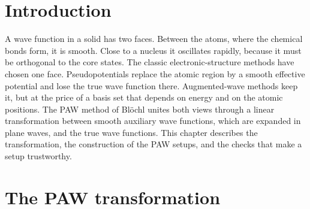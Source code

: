 \documentclass[11pt,a4paper,oneside]{book}
\begin{document}
\section{Introduction}

A wave function in a solid has two faces. Between the atoms, where the
chemical bonds form, it is smooth. Close to a nucleus it oscillates
rapidly, because it must be orthogonal to the core states. The classic
electronic-structure methods have chosen one face. Pseudopotentials
replace the atomic region by a smooth effective potential and lose the
true wave function there. Augmented-wave methods keep it, but at the
price of a basis set that depends on energy and on the atomic
positions. The PAW method of Bl\"ochl unites both views through a linear
transformation between smooth auxiliary wave functions, which are
expanded in plane waves, and the true wave functions. This chapter
describes the transformation, the construction of the PAW setups, and
the checks that make a setup trustworthy.


\section{The PAW transformation}
\end{document}
